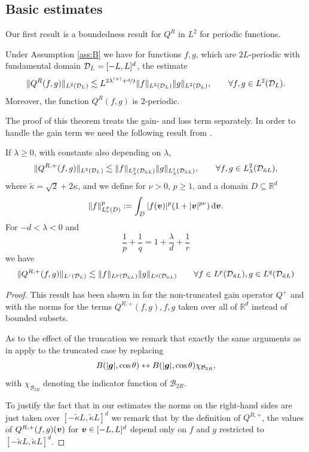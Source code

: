 \subsection{Basic estimates}

Our first result is a boundedness result for $Q^R$ in $L^2$ for periodic
functions. 
\begin{theorem}\label{thm:L2bound}
  Under Assumption \ref{ass:B} we have for functions $f,g$, which are $2L$-periodic
  with fundamental domain $\mathcal{D}_L=[-L,L]^d$, the estimate
    \[
        \|Q^R(f,g)\|_{L^2(\mathcal{D}_L)}\lesssim L^{2\lambda^{(+)}+\nicefrac{d}{2}}
                \|f\|_{L^2(\mathcal{D}_L)}\|g\|_{L^2(\mathcal{D}_L)}, \qquad \forall f,g\in L^2(\mathcal{D}_L).
    \]
    Moreover, the function $Q^R(f,g)$ is $2$-periodic. 
\end{theorem}
The proof of this theorem treats the gain- and loss term separately.  In order
to handle the gain term we need the following result from \cite[Theorems 1,
2]{Alonso2010cib}.
\begin{theorem}\label{thm:L2boundGain}
    If $\lambda \geq 0$, with constants also depending on $\lambda$,
    \[
        \|Q^{R,+}(f,g)\|_{L^2(\mathcal{D}_L)} \lesssim
                \|f\|_{L^2_\lambda(\mathcal{D}_{\tilde{\kappa}L})}
                \|g\|_{L^1_\lambda(\mathcal{D}_{\tilde{\kappa}L})},\qquad \forall
                f,g\in L^2_\lambda(\mathcal{D}_{\tilde{\kappa}L}),
    \]
    where $\tilde{\kappa}=\sqrt{2}+2\kappa$, and we define for $\nu>0$, $p\geq 1$, and a domain $D\subseteq
    \mathbb{R}^d$
    \[
        \|f\|_{L^p_\nu(D)}^p:=\int_{D} |f({\bm v})|^p(1 + |{\bm v}|^{p\nu})\,\mathrm{d}{\bm v}. 
    \]
    For $-d <\lambda <0$ and 
    \[
        \frac{1}{p} + \frac{1}{q} = 1 + \frac{\lambda}{d}+\frac{1}{r} 
    \]
    we have
    \[
        \|Q^{R,+}(f,g)\|_{L^r(\mathcal{D}_L)} \lesssim
        \|f\|_{L^p(\mathcal{D}_{\tilde{\kappa}L})}\|g\|_{L^q(\mathcal{D}_{\tilde{\kappa}L})}\qquad \forall f\in
        L^p(\mathcal{D}_{\tilde{\kappa}L}), g\in L^q(\mathcal{D}_{\tilde{\kappa}L})
    \]
\end{theorem}
\begin{proof}
    This result has been shown in \cite[Theorems 1, 2]{Alonso2010cib} for the
    non-truncated gain operator $Q^+$ and with the norms for the terms
    $Q^{R,+}(f,g), f, g$ taken over all of $\mathbb{R}^d$ instead of bounded subsets.

    As to the effect of the truncation we remark that exactly the same
    arguments as in \cite{Alonso2010cib} apply to the truncated case by replacing
    \[
        B(|{\bm g}|,\cos\theta)\leftrightarrow 
                B(|{\bm g}|,\cos\theta)\chi_{\mathcal{B}_{2R}},
    \]
    with $\chi_{\mathcal{B}_{2R}}$ denoting the indicator function of
    $\mathcal{B}_{2R}$.

    To justify the fact that in our estimates the norms on the right-hand sides
    are just taken over $[-\tilde{\kappa}L,\tilde{\kappa}L]^d$ we remark that by the definition of
    $Q^{R,+}$, the values of $Q^{R,+}(f,g)({\bm v})$ for ${\bm v}\in [-L,L]^d$ depend only
    on $f$ and $g$ restricted to $[-\tilde{\kappa}L,\tilde{\kappa}L]^d$.
\end{proof}
